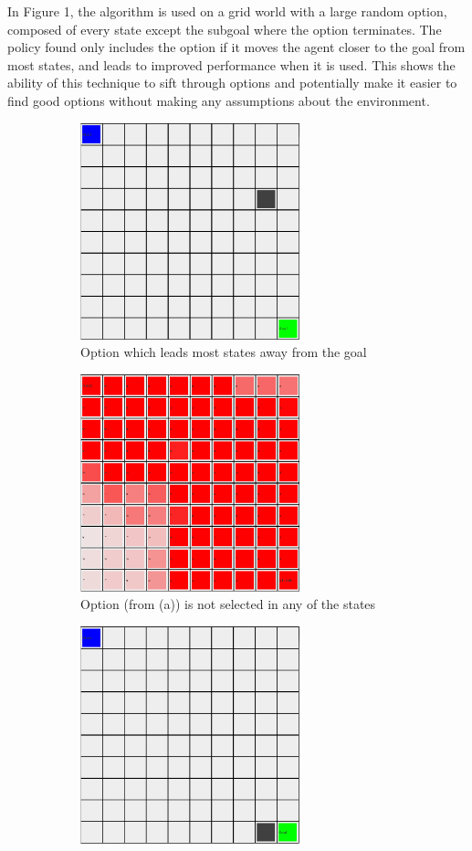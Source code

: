 \documentclass{acm_proc_article-sp}
\begin{document}
In Figure 1, the algorithm is used on a grid world with a large random option, composed of every state except the subgoal where the option terminates. The policy found only includes the option if it moves the agent closer to the goal from most states, and leads to improved performance when it is used. This shows the ability of this technique to sift through options and potentially make it easier to find good options without making any assumptions about the environment.

\begin{figure}[!htbp]
  \begin{subfigure}[h]{.5\textwidth}
  	\centering
    \includegraphics[width=2.5in]{GiantOp1.png}
    \caption{Option which leads most states away from the goal}
  \end{subfigure}\hfill
  \begin{subfigure}[h]{.5\textwidth}
  \centering
    \includegraphics[width=2.5in]{GiantOption1Pol.png}
    \caption{Option (from (a)) is not selected in any of the states}
  \end{subfigure}
  \hfill
  \begin{subfigure}[h]{.5\textwidth}
  \centering
    \includegraphics[width=2.5in]{GiantOp2.png}

\end{subfigure}
\end{figure}
\end{document}
